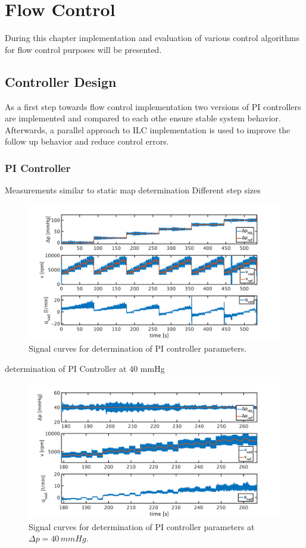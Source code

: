\chapter{Flow Control}
During this chapter implementation and evaluation of various control algorithms for flow control purposes will be presented.
\section{Controller Design}
As a first step towards flow control implementation two versions of PI controllers are implemented and compared to each othe ensure stable system behavior. Afterwards, a parallel approach to ILC implementation is used to improve the follow up behavior and reduce control errors.
\subsection{PI Controller}
Measurements similar to static map determination
Different step sizes
\begin{figure}[ht]
  \centering
  \includegraphics[width=\textwidth]{images/chapt_5/dyn_measure.pdf}
  \caption[Signal curves for determination of PI controller parameters]{Signal curves for determination of PI controller parameters.}
  \label{fig:dyn_meas}
\end{figure}

determination of PI Controller at 40 mmHg


\begin{figure}[ht]
  \centering
  \includegraphics[width=\textwidth]{images/chapt_5/dyn_meas_40.pdf}
  \caption[Signal curves for determination of PI controller parameters at $\Delta{p}=40\,mmHg$]{Signal curves for determination of PI controller parameters at $\Delta{p}=40\,mmHg$.}
  \label{fig:dyn_meas_40}
\end{figure}

